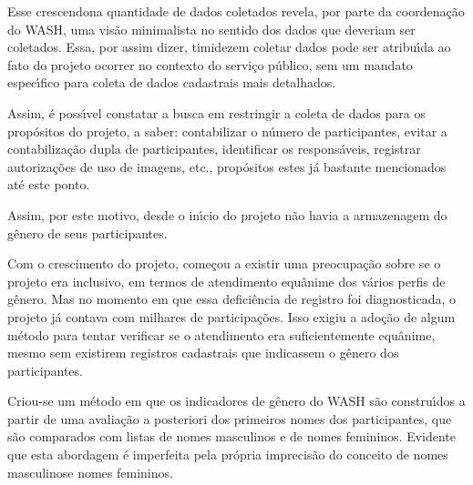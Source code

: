 \documentclass[
12pt,		%
openright,	%
twoside,  %
a4paper,			%
chapter=TITLE,		%
english,			%
french,				%
spanish,			%
brazil				%
]{USPSC-classe/USPSC_RedarTex}
\begin{document}
Esse \textquotedbl crescendo\textquotedbl  na quantidade de dados coletados revela, por parte da coordena\c{c}\~ao do WASH, uma vis\~ao minimalista no sentido dos dados que deveriam ser coletados. Essa, por assim dizer, \textquotedbl timidez\textquotedbl  em coletar dados pode ser atribu\'{\i}da ao fato do projeto ocorrer no contexto do servi\c{c}o p\'ublico, sem um mandato espec\'{\i}fico para coleta de dados cadastrais mais detalhados.










Assim, \'e poss\'{\i}vel constatar a busca em restringir a coleta de dados para os prop\'ositos do projeto, a saber: contabilizar o n\'umero de participantes, evitar a contabiliza\c{c}\~ao dupla de participantes, identificar os respons\'aveis, registrar autoriza\c{c}\~oes de uso de imagens, etc., prop\'ositos estes j\'a bastante mencionados at\'e este ponto.










Assim, por este motivo, desde o in\'{\i}cio do projeto n\~ao havia a armazenagem do g\^enero de seus participantes.










Com o crescimento do projeto, come\c{c}ou a existir uma preocupa\c{c}\~ao sobre se o projeto era inclusivo, em termos de atendimento equ\^anime dos v\'arios perfis de g\^enero. Mas no momento em que essa defici\^encia de registro foi diagnosticada, o projeto j\'a contava com milhares de participa\c{c}\~oes. Isso exigiu a ado\c{c}\~ao de algum m\'etodo para tentar verificar se o atendimento era suficientemente equ\^anime, mesmo sem existirem registros cadastrais que indicassem o g\^enero dos participantes.










Criou-se um m\'etodo em que os indicadores de g\^enero do WASH s\~ao constru\'{\i}dos a partir de uma avalia\c{c}\~ao a posteriori dos primeiros nomes dos participantes, que s\~ao comparados com listas de nomes masculinos e de nomes femininos. Evidente que esta abordagem \'e imperfeita pela pr\'opria imprecis\~ao do conceito de \textquotedbl nomes masculinos\textquotedbl  e \textquotedbl nomes femininos\textquotedbl .
\end{document}
